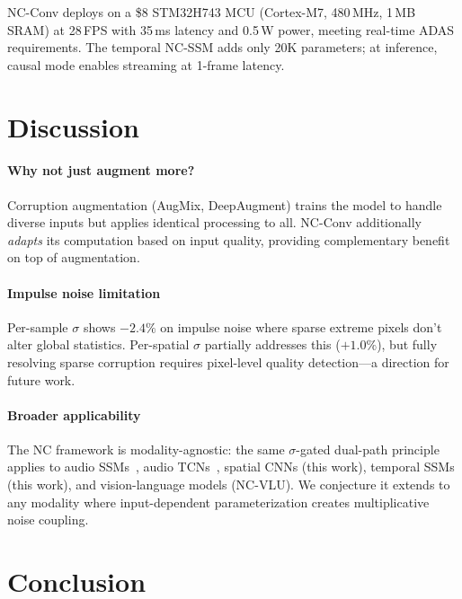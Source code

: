 \documentclass[journal]{IEEEtran}
\begin{document}
NC-Conv deploys on a \$8 STM32H743 MCU (Cortex-M7, 480\,MHz, 1\,MB SRAM) at 28\,FPS with 35\,ms latency and 0.5\,W power, meeting real-time ADAS requirements.
The temporal NC-SSM adds only 20K parameters; at inference, causal mode enables streaming at 1-frame latency.


\section{Discussion}
\label{sec:discussion}

\paragraph{Why not just augment more?}
Corruption augmentation (AugMix, DeepAugment) trains the model to handle diverse inputs but applies identical processing to all.
NC-Conv additionally \emph{adapts} its computation based on input quality, providing complementary benefit on top of augmentation.

\paragraph{Impulse noise limitation}
Per-sample $\sigma$ shows $-2.4\%$ on impulse noise where sparse extreme pixels don't alter global statistics.
Per-spatial $\sigma$ partially addresses this ($+1.0\%$), but fully resolving sparse corruption requires pixel-level quality detection---a direction for future work.

\paragraph{Broader applicability}
The NC framework is modality-agnostic: the same $\sigma$-gated dual-path principle applies to audio SSMs~\cite{choi2026ncssm}, audio TCNs~\cite{choi2026nctcn}, spatial CNNs (this work), temporal SSMs (this work), and vision-language models (NC-VLU).
We conjecture it extends to any modality where input-dependent parameterization creates multiplicative noise coupling.


\section{Conclusion}
\label{sec:conclusion}
\end{document}

